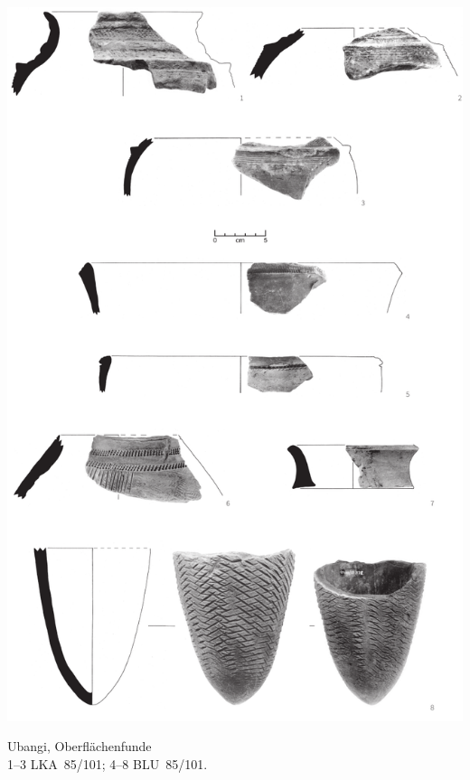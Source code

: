 \begin{pl}[H]
	\includegraphics{plt/Taf4.pdf}
	\vspace{.75em}\caption{\mbox{Ubangi}, Oberflächenfunde \\ 1--3 LKA~85/101; 4--8 BLU~85/101.}
	\label{pl:4}
\end{pl}

